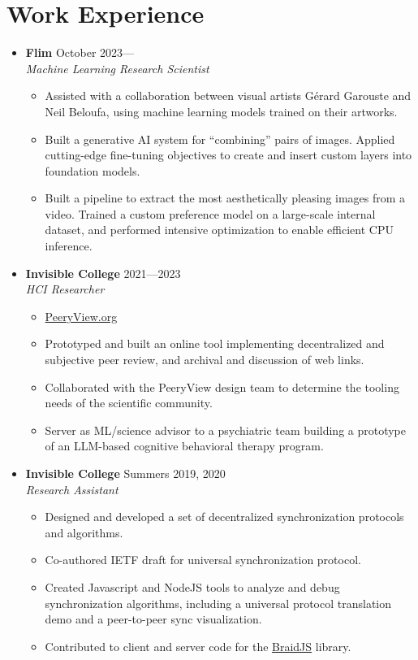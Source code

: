 \documentclass[12pt,letterpaper]{article}
\newenvironment{explist}
{\begin{itemize}[label=\textbf{--},itemsep=1pt,topsep=0pt,partopsep=0pt,parsep=0pt]}
{\end{itemize}}
\begin{document}
\section*{Work Experience} \vspace{-0.5em}
\begin{itemize}[label=]
    \item
        \textbf{Flim} \hfill October 2023---\\
        \textit{Machine Learning Research Scientist}
        \begin{explist}
        \item Assisted with a collaboration between visual artists G\'erard Garouste and Neil Beloufa, using machine learning models trained on their artworks.
        \item Built a generative AI system for ``combining'' pairs of images.
            Applied cutting-edge fine-tuning objectives to create and insert custom layers into foundation models.
        \item Built a pipeline to extract the most aesthetically pleasing images from a video.
            Trained a custom preference model on a large-scale internal dataset,
            and performed intensive optimization to enable efficient CPU inference.
        \end{explist}

    \item
        \textbf{Invisible College} \hfill 2021---2023\\
        \textit{HCI Researcher}
        \begin{explist}
        \item \href{https://peeryview.org}{PeeryView.org}
        \item Prototyped and built an online tool implementing decentralized and subjective peer review, and archival and discussion of web links.
        \item Collaborated with the PeeryView design team to determine the tooling needs of the scientific community.
        \item Server as ML/science advisor to a psychiatric team building a prototype of an LLM-based cognitive behavioral therapy program.
        \end{explist}
    \item
        \textbf{Invisible College} \hfill Summers 2019, 2020\\
        \textit{Research Assistant}
        \begin{explist}
        \item Designed and developed a set of decentralized synchronization protocols and algorithms.
        \item Co-authored IETF draft for universal synchronization protocol.
        \item Created Javascript and NodeJS tools to analyze and debug synchronization algorithms, including a universal protocol translation demo and a peer-to-peer sync visualization.
        \item Contributed to client and server code for the \href{https://github.com/braid-work/braidjs}{BraidJS} library.
        \end{explist}


\end{itemize}
\end{document}
